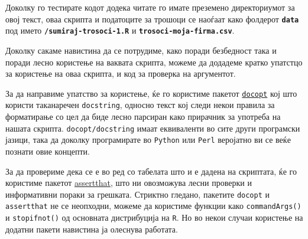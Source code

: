 \documentclass[
]{book}
\begin{document}
Доколку го тестирате кодот додека читате го имате преземено директориумот за овој текст, оваа скрипта и податоците за трошоци се наоѓаат како фолдерот \textbf{\texttt{data}} под името \textbf{\texttt{/sumiraj-trosoci-1.R}} и \textbf{\texttt{trosoci-moja-firma.csv}}.

Доколку сакаме навистина да се потрудиме, како поради безбедност така и поради лесно користење на ваквата скрипта, можеме да додадеме кратко упатстцо за користење на оваа скрипта, и код за проверка на аргументот.

За да направиме упатство за користење, ќе го користиме пакетот \href{https://github.com/docopt/docopt.R}{\texttt{docopt}} кој што користи таканаречен \texttt{docstring}, односно текст кој следи некои правила за форматирање со цел да биде лесно парсиран како прирачник за употреба на нашата скрипта. \texttt{docopt/docstring} имаат еквиваленти во сите други програмски јазици, така да доколку програмирате во \texttt{Python} или \texttt{Perl} веројатно ви се веќе познати овие концепти.

За да провериме дека се е во ред со табелата што и е дадена на скриптата, ќе го користиме пакетот \href{https://github.com/hadley/assertthat}{assertthat}, што ни овозможува лесни проверки и информативни пораки за грешката. Стриктно гледано, пакетите \texttt{docopt} и \texttt{assertthat} не се неопходни, можеме да користиме функции како \texttt{commandArgs()} и \texttt{stopifnot()} од основната дистрибуција на \texttt{R}. Но во некои случаи користење на додатни пакети навистина ја олеснува работата.
\end{document}
